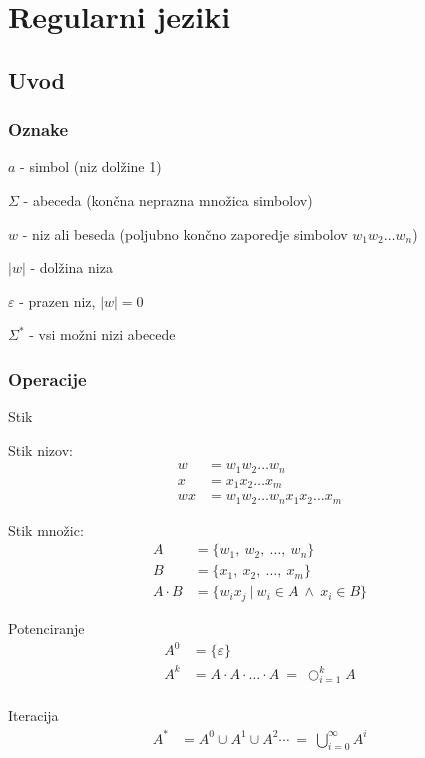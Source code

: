 \documentclass[10pt,a4paper,oneside]{book}
\begin{document}
\pagebreak
\chapter{Regularni jeziki}

\section{Uvod}
\subsection*{Oznake}
\begin{items}
\item $a$ - simbol (niz dolžine 1)
\item $\Sigma$ - abeceda (končna neprazna množica simbolov)
\item $w$ - niz ali beseda (poljubno končno zaporedje  simbolov $w_1w_2 \ldots w_n$)
\item $|w|$ - dolžina niza
\item $\varepsilon$ - prazen niz, $|w|=0$
\item $\Sigma^*$ - vsi možni nizi abecede
\end{items}

\subsection*{Operacije}
\begin{items}
\item Stik
	\begin{items}
	\item Stik nizov:
		\begin{align*}
		w  &= w_1 w_2 \dots w_n\\
		x  &= x_1 x_2 \dots x_m\\
		wx &= w_1 w_2 \dots w_n x_1 x_2 \dots x_m
		\end{align*}
	\item Stik množic:
		\begin{align*} 
		A & = \lbrace w_1 ,\ w_2 ,\ \dots ,\ w_n \rbrace \\ 
		B & = \lbrace x_1 ,\ x_2 ,\ \dots ,\ x_m \rbrace \\ 
		A \cdot B & = \lbrace w_ix_j \ | \ w_i \in A \ \wedge \ x_i \in B \rbrace
		\end{align*} 
	\end{items}
\item Potenciranje
	\begin{align*} 
	A^0 & = \lbrace \varepsilon \rbrace \\
	A^k & = A \cdot A \cdot \ldots \cdot A \ = \ \bigcirc_{i=1}^{k} A \\
	\end{align*}
\item Iteracija
	\begin{align*} 
	A^* &= A^0 \cup A^1 \cup A^2 \cdots  \ = \ \bigcup_{i=0}^{ \infty } A^i
	\end{align*} 		
\end{items}
\end{document}
